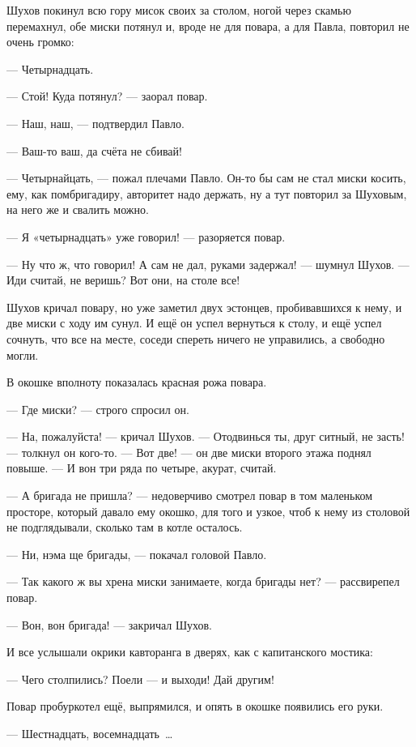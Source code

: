 Шухов покинул всю гору мисок своих за столом, ногой через скамью перемахнул, обе миски потянул и, вроде не для повара, а для Павла, повторил не очень громко:

--- Четырнадцать.

--- Стой! Куда потянул? --- заорал повар.

--- Наш, наш, --- подтвердил Павло.

--- Ваш-то ваш, да счёта не сбивай!

--- Четырнайцать, --- пожал плечами Павло. Он-то бы сам не стал миски косить, ему, как помбригадиру, авторитет надо держать, ну а тут повторил за Шуховым, на него же и свалить можно.

--- Я «четырнадцать» уже говорил! --- разоряется повар.

--- Ну что ж, что говорил! А сам не дал, руками задержал! --- шумнул Шухов. --- Иди считай, не веришь? Вот они, на столе все!

Шухов кричал повару, но уже заметил двух эстонцев, пробивавшихся к нему, и две миски с ходу им сунул. И ещё он успел вернуться к столу, и ещё успел сочнуть, что все на месте, соседи спереть ничего не управились, а свободно могли.

В окошке вполноту показалась красная рожа повара.

--- Где миски? --- строго спросил он.

--- На, пожалуйста! --- кричал Шухов. --- Отодвинься ты, друг ситный, не засть! --- толкнул он кого-то. --- Вот две! --- он две миски второго этажа поднял повыше. --- И вон три ряда по четыре, акурат, считай.

--- А бригада не пришла? --- недоверчиво смотрел повар в том маленьком просторе, который давало ему окошко, для того и узкое, чтоб к нему из столовой не подглядывали, сколько там в котле осталось.

--- Ни, нэма ще бригады, --- покачал головой Павло.

--- Так какого ж вы хрена миски занимаете, когда бригады нет? --- рассвирепел повар.

--- Вон, вон бригада! --- закричал Шухов.

И все услышали окрики кавторанга в дверях, как с капитанского мостика:

--- Чего столпились? Поели --- и выходи! Дай другим!

Повар пробуркотел ещё, выпрямился, и опять в окошке появились его руки.

--- Шестнадцать, восемнадцать~\dots{}

